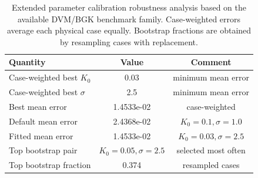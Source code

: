 \begin{table}[t]
\centering
\caption{Extended parameter calibration robustness analysis based on the available DVM/BGK benchmark family. Case-weighted errors average each physical case equally. Bootstrap fractions are obtained by resampling cases with replacement.}
\label{tab:exp18_parameter_robustness}
\begin{tabular}{lcc}
\toprule
Quantity & Value & Comment \\
\midrule
Case-weighted best $K_0$ & 0.03 & minimum mean error \\
Case-weighted best $\sigma$ & 2.5 & minimum mean error \\
Best mean error & 1.4533e-02 & case-weighted \\
Default mean error & 2.4368e-02 & $K_0=0.1,\sigma=1.0$ \\
Fitted mean error & 1.4533e-02 & $K_0=0.03,\sigma=2.5$ \\
Top bootstrap pair & $K_0=0.05,\sigma=2.5$ & selected most often \\
Top bootstrap fraction & 0.374 & resampled cases \\
\bottomrule
\end{tabular}
\end{table}
